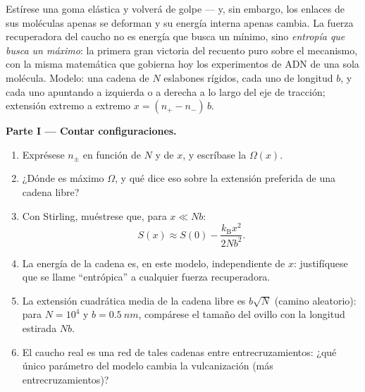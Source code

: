 \begin{problem}\label{pb:b3:microcanonical-ensemble:1}
Estírese una goma elástica y volverá de golpe --- y, sin embargo, los enlaces
de sus moléculas apenas se deforman y su energía interna apenas cambia. La
fuerza recuperadora del caucho no es energía que busca un mínimo, sino
\emph{entropía que busca un máximo}: la primera gran victoria del recuento
puro sobre el mecanismo, con la misma matemática que gobierna hoy los
experimentos de ADN de una sola molécula. Modelo: una cadena de $N$ eslabones
rígidos, cada uno de longitud $b$, y cada uno apuntando a izquierda o a
derecha a lo largo del eje de tracción; extensión extremo a extremo
$x = (n_+ - n_-)\,b$.

\medskip\noindent\textbf{Parte I --- Contar configuraciones.}
\begin{enumerate}
  \item Exprésese $n_\pm$ en función de $N$ y de $x$, y escríbase la
         $\Omega(x)$.
  \item ¿Dónde es máximo $\Omega$, y qué dice eso sobre la extensión
        preferida de una cadena libre?
  \item Con Stirling, muéstrese que, para $x \ll Nb$:
        \[
        S(x) \approx S(0) - \frac{k_{\text{B}}x^2}{2Nb^2} .
        \]
  \item La energía de la cadena es, en este modelo, independiente de $x$:
        justifíquese que se llame ``entrópica'' a cualquier fuerza
        recuperadora.
  \item La extensión cuadrática media de la cadena libre es $b\sqrt N$
        (camino aleatorio): para $N = 10^4$ y $b = \qty{0.5}{nm}$,
        compárese el tamaño del ovillo con la longitud estirada $Nb$.
  \item El caucho real es una red de tales cadenas entre
        entrecruzamientos: ¿qué único parámetro del modelo cambia la
        vulcanización (más entrecruzamientos)?
\end{enumerate}


\end{problem}
